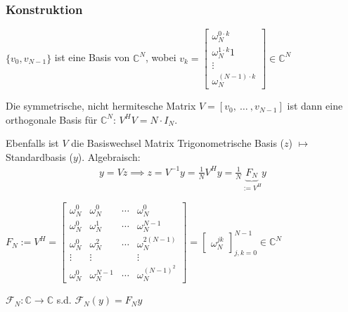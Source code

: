 \subsubsection{Konstruktion}

 $\{v_0, v_{N-1}\}$ ist eine Basis von $\mathbb{C}^N$, wobei $v_k = \begin{bmatrix}
    \omega_N^{0\cdot k} \\ \omega_N^{1\cdot k}1 \\ \vdots \\ \omega_N^{(N-1)\cdot k}
\end{bmatrix} \in \mathbb{C}^N$ 

Die symmetrische, nicht hermitesche Matrix $V = [v_0,\ \ldots\ , v_{N-1}]$ ist dann eine orthogonale Basis für $\mathbb{C}^N$: $V^HV = N\cdot I_N$.

Ebenfalls ist $V$ die Basiswechsel Matrix Trigonometrische Basis ($z$) $\mapsto$ Standardbasis ($y$). Algebraisch:
\begin{align*}
    y = Vz \implies z = V^{-1}y = \frac{1}{N}V^Hy = \frac{1}{N}\underbrace{F_N}_{:= V^H} y
\end{align*}

 $F_N := V^H = \begin{bmatrix}
    \omega_N^0 & \omega_N^0 & \cdots & \omega_N^0 \\
    \omega_N^0 & \omega_N^1 & \cdots & \omega_N^{N-1} \\
    \omega_N^0 & \omega_N^2 & \cdots & \omega_N^{2(N-1)} \\
    \vdots     & \vdots     &        & \vdots \\
    \omega_N^0 & \omega_N^{N-1} &\cdots & \omega_N^{(N-1)^2} 
\end{bmatrix}
= \begin{bmatrix}
    \omega_N^{jk}
\end{bmatrix}^{N-1}_{j,k = 0} \in \mathbb{C}^N
$

 $\mathcal{F}_N: \mathbb{C} \to \mathbb{C}$ s.d. $\mathcal{F}_N(y) = F_N y$